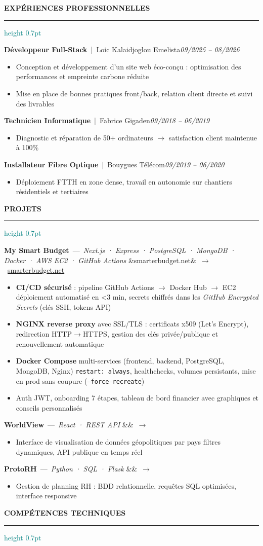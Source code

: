 \documentclass[a4paper,9.5pt]{article}
\newcommand{\cvsection}[1]{%
  \vspace{2pt}%
  {\color{navy}\textbf{\uppercase{#1}}}%
  \vspace{1pt}%
  \textcolor{teal}{\hrule height 0.7pt}%
  \vspace{2pt}%
}
\newcommand{\cventry}[4]{%
  \vspace{2pt}%
  {\color{navy}\textbf{#1}}~{\color{gray}|~#2}\hfill{\color{gray}\textit{\footnotesize #3}}\\[-3pt]
  #4%
}
\newcommand{\cvbullet}[1]{%
  \begin{itemize}[leftmargin=1em, itemsep=0pt, topsep=0pt, parsep=0pt]
    \item[\textcolor{teal}{\footnotesize--}] {\small #1}
  \end{itemize}%
}
\newcommand{\cvproject}[5]{%
  \vspace{2pt}%
  {\color{navy}\textbf{#1}}~{\color{gray}---}~{\color{teal}\itshape\small #2}%
  \ifx&#3&\else~{\color{gray}$\rightarrow$}~\href{#4}{\small #3}\fi\\[-3pt]
  #5%
}
\begin{document}
\vspace{2pt}

\cvsection{Expériences professionnelles}

\cventry{Développeur Full-Stack}{Loic Kalaidjoglou  Emelista}{09/2025 -- 08/2026}{%
  \cvbullet{Conception et développement d'un site web éco-conçu : optimisation des performances et empreinte carbone réduite}
  \cvbullet{Mise en place de bonnes pratiques front/back, relation client directe et suivi des livrables}
}

\cventry{Technicien Informatique}{Fabrice Gigaden}{09/2018 -- 06/2019}{%
  \cvbullet{Diagnostic et réparation de 50+ ordinateurs $\rightarrow$ satisfaction client maintenue à 100\%}
}

\cventry{Installateur Fibre Optique}{Bouygues Télécom}{09/2019 -- 06/2020}{%
  \cvbullet{Déploiement FTTH en zone dense, travail en autonomie sur chantiers résidentiels et tertiaires}
}

\cvsection{Projets}

\cvproject{My Smart Budget}{Next.js · Express · PostgreSQL · MongoDB · Docker · AWS EC2 · GitHub Actions}{smarterbudget.net}{https://smarterbudget.net}{%
  \cvbullet{\textbf{CI/CD sécurisé} : pipeline GitHub Actions $\rightarrow$ Docker Hub $\rightarrow$ EC2  déploiement automatisé en \textless{}3 min, secrets chiffrés dans les \textit{GitHub Encrypted Secrets} (clés SSH, tokens API)}
  \cvbullet{\textbf{NGINX reverse proxy} avec SSL/TLS : certificats x509 (Let's Encrypt), redirection HTTP$\rightarrow$HTTPS, gestion des clés privée/publique et renouvellement automatique}
  \cvbullet{\textbf{Docker Compose} multi-services (frontend, backend, PostgreSQL, MongoDB, Nginx)  \texttt{restart: always}, healthchecks, volumes persistants, mise en prod sans coupure (\texttt{--force-recreate})}
  \cvbullet{Auth JWT, onboarding 7 étapes, tableau de bord financier avec graphiques et conseils personnalisés}
}

\cvproject{WorldView}{React · REST API}{}{}{%
  \cvbullet{Interface de visualisation de données géopolitiques par pays  filtres dynamiques, API publique en temps réel}
}

\cvproject{ProtoRH}{Python · SQL · Flask}{}{}{%
  \cvbullet{Gestion de planning RH : BDD relationnelle, requêtes SQL optimisées, interface responsive}
}

\cvsection{Compétences techniques}
\end{document}
